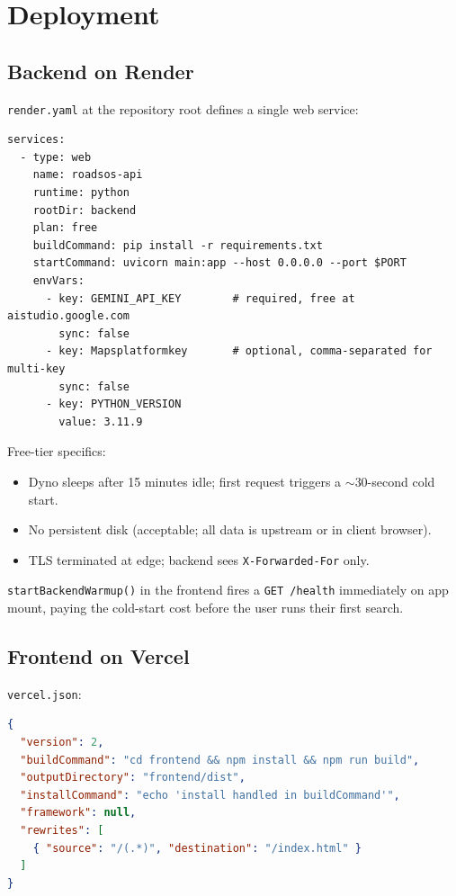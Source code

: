 \documentclass[11pt, a4paper]{article}
\newcommand{\file}[1]{\texttt{\small\color{rsblue}#1}}
\newcommand{\code}[1]{\texttt{\small#1}}
\begin{document}
\section{Deployment}

\subsection{Backend on Render}

\file{render.yaml} at the repository root defines a single web service:

\begin{lstlisting}[language={},caption={render.yaml}]
services:
  - type: web
    name: roadsos-api
    runtime: python
    rootDir: backend
    plan: free
    buildCommand: pip install -r requirements.txt
    startCommand: uvicorn main:app --host 0.0.0.0 --port $PORT
    envVars:
      - key: GEMINI_API_KEY        # required, free at aistudio.google.com
        sync: false
      - key: Mapsplatformkey       # optional, comma-separated for multi-key
        sync: false
      - key: PYTHON_VERSION
        value: 3.11.9
\end{lstlisting}

Free-tier specifics:

\begin{itemize}[leftmargin=*, itemsep=2pt, topsep=2pt]
  \item Dyno sleeps after 15 minutes idle; first request triggers a $\sim$30-second cold start.
  \item No persistent disk (acceptable; all data is upstream or in client browser).
  \item TLS terminated at edge; backend sees \code{X-Forwarded-For} only.
\end{itemize}

\code{startBackendWarmup()} in the frontend fires a \code{GET /health} immediately on app mount, paying the cold-start cost before the user runs their first search.

\subsection{Frontend on Vercel}

\file{vercel.json}:

\begin{lstlisting}[language=json,caption={vercel.json}]
{
  "version": 2,
  "buildCommand": "cd frontend && npm install && npm run build",
  "outputDirectory": "frontend/dist",
  "installCommand": "echo 'install handled in buildCommand'",
  "framework": null,
  "rewrites": [
    { "source": "/(.*)", "destination": "/index.html" }
  ]
}
\end{lstlisting}
\end{document}
